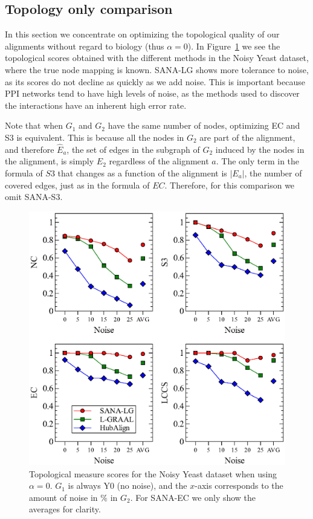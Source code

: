 \documentclass{bioinfo}
\newcommand{\Eb}{\hat{E}}
\begin{document}
\subsection{Topology only comparison}\label{top}

In this section we concentrate on optimizing the topological quality of our alignments without regard to biology (thus $\alpha=0$).
In Figure~\ref{fig:syntheticyeast} we see the topological scores obtained with the different methods in the Noisy Yeast dataset, where the true node mapping is known. SANA-LG shows more tolerance to noise, as its scores do not decline as quickly as we add noise. This is important because PPI networks tend to have high levels of noise, as the methods used to discover the interactions have an inherent high error rate.

Note that when $G_1$ and $G_2$ have the same number of nodes, optimizing EC and S3 is equivalent. This is because all the nodes in $G_2$ are part of the alignment, and therefore $\Eb_a$, the set of edges in the subgraph of $G_2$ induced by the nodes in the alignment, is simply $E_2$ regardless of the alignment $a$. The only term in the formula of $S3$ that changes as a function of the alignment is $|E_a|$, the number of covered edges, just as in the formula of $EC$. Therefore, for this comparison we omit SANA-S3.

\begin{figure}
\centering
\includegraphics[width=0.99\linewidth]{syeastBeta0.eps}
\caption{Topological measure scores for the Noisy Yeast dataset when using $\alpha=0$. $G_1$ is always Y0 (no noise), and the $x$-axis corresponds to the amount of noise in $\%$ in $G_2$. For SANA-EC we only show the averages for clarity.}
\label{fig:syntheticyeast}
\end{figure}
\end{document}
